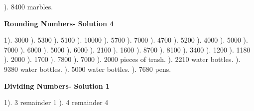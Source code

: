 \documentclass{article}%
\begin{document}
). 8400 marbles.%
\newline%
\newpage%
\large%
\begin{center}%
\textbf{Rounding Numbers- Solution 4}%
\newline%
\end{center} \normalsize%
1). 3000%
). 5300%
). 5100%
). 10000%
). 5700%
). 7000%
). 4700%
). 5200%
). 4000%
). 5000%
). 7000%
). 6000%
). 5000%
). 6000%
). 2100%
). 1600%
). 8700%
). 8100%
). 3400%
). 1200%
). 1180%
). 2000%
). 1700%
). 7800%
). 7000%
). 2000 pieces of trash.%
). 2210 water bottles.%
). 9380 water bottles.%
). 5000 water bottles.%
). 7680 pens.%
\newline%
\newpage%
\large%
\begin{center}%
\textbf{Dividing Numbers- Solution 1}%
\newline%
\end{center} \normalsize%
1). 3 remainder 1%
). 4 remainder 4%
\newline%
\end{document}
